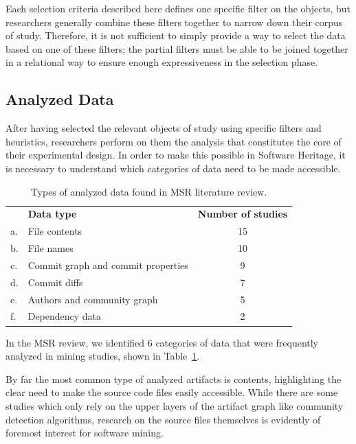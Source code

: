 Each selection criteria described here defines one specific filter on the
objects, but researchers generally combine these filters together to narrow
down their corpus of study. Therefore, it is not sufficient to simply provide a
way to select the data based on one of these filters; the partial filters must
be able to be joined together in a relational way to ensure enough
expressiveness in the selection phase.

\subsection{Analyzed Data}

After having selected the relevant objects of study using specific filters and
heuristics, researchers perform on them the analysis that constitutes the core
of their experimental design. In order to make this possible in Software
Heritage, it is necessary to understand which categories of data need to be
made accessible.

\begin{table}
    \begin{tabular}{l l c}
        & \textbf{Data type} & \textbf{Number of studies} \\
         a. & File contents & 15 \\
         b. & File names & 10 \\
         c. & Commit graph and commit properties & 9 \\
         d. & Commit diffs & 7 \\
         e. & Authors and community graph & 5 \\
         f. & Dependency data & 2 \\
    \end{tabular}
    \centering
    \caption{Types of analyzed data found in MSR literature review.}%
    \label{tab:analyzed-data}
\end{table}

In the MSR review, we identified 6 categories of data that were
frequently analyzed in mining studies, shown in Table~\ref{tab:analyzed-data}.

By far the most common type of analyzed artifacts is contents, highlighting the
clear need to make the source code files easily accessible. While there are
some studies which only rely on the upper layers of the artifact graph like
community detection algorithms, research on the source files themselves is
evidently of foremost interest for software mining.

